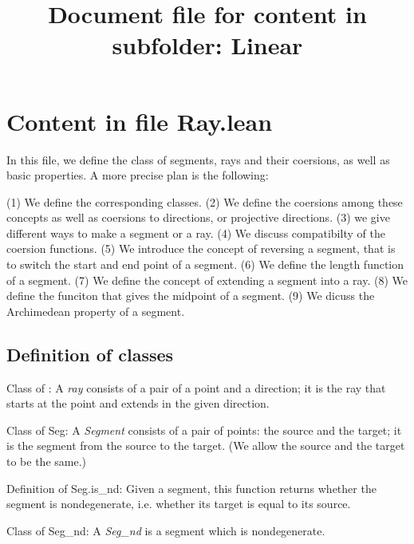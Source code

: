 \documentclass[12pt,a4paper]{article}
\title{Document file for content in subfolder: Linear}
\begin{document}
\section{Content in file Ray.lean}

In this file, we define the class of segments, rays and their coersions, as well as basic properties.  A more precise plan is the following:

(1) We define the corresponding classes. 
(2) We define the coersions among these concepts as well as coersions to directions, or projective directions.
(3) we give different ways to make a segment or a ray.
(4) We discuss compatibilty of the coersion functions.
(5) We introduce the concept of reversing a segment, that is to switch the start and end point of a segment.
(6) We define the length function of a segment.
(7) We define the concept of extending a segment into a ray.
(8) We define the funciton that gives the midpoint of a segment.
(9) We dicuss the Archimedean property of a segment.

\subsection{Definition of classes}

Class of : A \emph{ray} consists of a pair of a point and a direction; it is the ray that starts at the point and extends in the given direction.

Class of Seg: A \emph{Segment} consists of a pair of points: the source and the target; it is the segment from the source to the target. (We allow the source and the target to be the same.)

Definition of Seg.is_nd: Given a segment, this function returns whether the segment is nondegenerate, i.e. whether its target is equal to its source.

Class of Seg_nd: A \emph{Seg_nd} is a segment which is nondegenerate.
\end{document}
